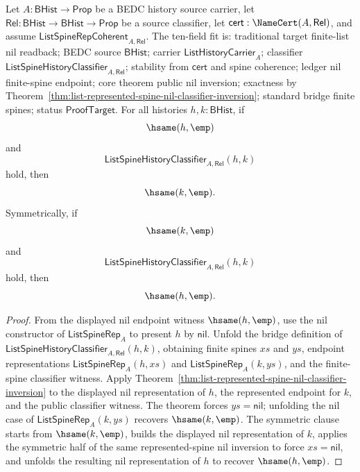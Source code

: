 \begin{theorem}
\label{thm:list-public-classifier-nil-endpoint-inversion}
Let $A:\mathsf{BHist}\to\mathsf{Prop}$ be a BEDC history source carrier, let
$\mathsf{Rel}:\mathsf{BHist}\to\mathsf{BHist}\to\mathsf{Prop}$ be a source
classifier, let $\mathsf{cert}:\NameCert(A,\mathsf{Rel})$, and assume
$\mathsf{ListSpineRepCoherent}_{A,\mathsf{Rel}}$. The ten-field fit is:
traditional target finite-list nil readback; BEDC source $\mathsf{BHist}$;
carrier $\mathsf{ListHistoryCarrier}_A$; classifier
$\mathsf{ListSpineHistoryClassifier}_{A,\mathsf{Rel}}$; stability from
$\mathsf{cert}$ and spine coherence; ledger nil finite-spine endpoint; core
theorem public nil inversion; exactness by
Theorem~\ref{thm:list-represented-spine-nil-classifier-inversion}; standard
bridge finite spines; status $\mathsf{ProofTarget}$. For all histories
$h,k:\mathsf{BHist}$, if
$$
\hsame(h,\emp)
$$
and
$$
\mathsf{ListSpineHistoryClassifier}_{A,\mathsf{Rel}}(h,k)
$$
hold, then
$$
\hsame(k,\emp).
$$
Symmetrically, if
$$
\hsame(k,\emp)
$$
and
$$
\mathsf{ListSpineHistoryClassifier}_{A,\mathsf{Rel}}(h,k)
$$
hold, then
$$
\hsame(h,\emp).
$$
\end{theorem}
\begin{proof}
From the displayed nil endpoint witness $\hsame(h,\emp)$, use the nil
constructor of $\mathsf{ListSpineRep}_A$ to present $h$ by
$\mathsf{nil}$. Unfold the bridge definition of
$\mathsf{ListSpineHistoryClassifier}_{A,\mathsf{Rel}}(h,k)$, obtaining finite
spines $xs$ and $ys$, endpoint representations
$\mathsf{ListSpineRep}_A(h,xs)$ and $\mathsf{ListSpineRep}_A(k,ys)$, and the
finite-spine classifier witness. Apply
Theorem~\ref{thm:list-represented-spine-nil-classifier-inversion} to the
displayed nil representation of $h$, the represented endpoint for $k$, and the
public classifier witness. The theorem forces $ys=\mathsf{nil}$; unfolding the
nil case of $\mathsf{ListSpineRep}_A(k,ys)$ recovers $\hsame(k,\emp)$. The
symmetric clause starts from $\hsame(k,\emp)$, builds the displayed nil
representation of $k$, applies the symmetric half of the same represented-spine
nil inversion to force $xs=\mathsf{nil}$, and unfolds the resulting nil
representation of $h$ to recover $\hsame(h,\emp)$.
\end{proof}

